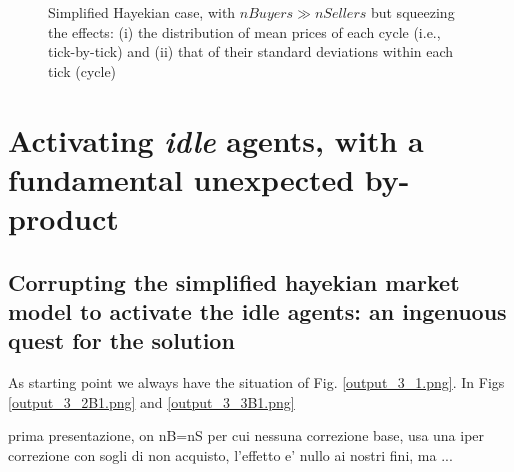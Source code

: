 \documentclass[10pt]{report}
\begin{document}
\begin{appendices}
\begin{figure}[H]
\begin{center}
\caption{Simplified Hayekian case, with $nBuyers \gg nSellers$ but squeezing the effects: (i) the distribution of mean prices of each cycle (i.e., tick-by-tick) and (ii) that of their standard deviations within each tick (cycle)}
\label{output_3_3bbb.png}
\end{center}
\end{figure}


\chapter{Activating \emph{idle} agents, with a fundamental unexpected by-product}\label{Activating idle agents}
\thispagestyle{fancy}

\section{Corrupting the simplified hayekian market model to activate the idle agents: an ingenuous quest for the solution}

As starting point we always have the situation of Fig. \ref{output_3_1.png}. In Figs \ref{output_3_2B1.png} and \ref{output_3_3B1.png}



prima presentazione, on nB=nS per cui nessuna correzione base, usa una iper correzione con sogli di non acquisto, l'effetto e' nullo ai nostri fini, ma ...


\end{appendices}
\end{document}
